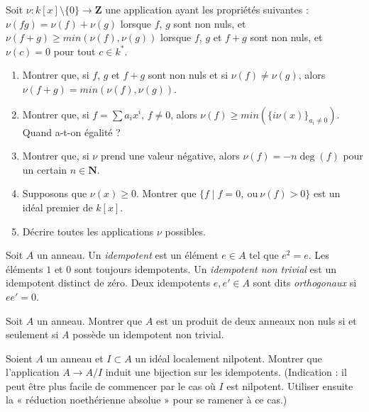 \begin{exercise}
\label{exercise-valuation}
Soit $\nu : k[x]\setminus \{0\}  \to {\mathbf Z}$ une application
ayant les propriétés suivantes : $\nu(fg) = \nu(f) + \nu(g)$ lorsque
$f$, $g$ sont non nuls, et $\nu(f + g) \geq min(\nu(f), \nu(g))$ lorsque
$f$, $g$ et $f + g$ sont non nuls, et $\nu(c) = 0$ pour tout $c\in k^*$.
\begin{enumerate}
\item Montrer que, si $f$, $g$ et $f + g$ sont non nuls et si
$\nu(f) \not = \nu(g)$, alors $\nu(f + g) = min(\nu(f), \nu(g))$.
\item Montrer que, si $f = \sum a_i x^i$, $f\not = 0$, alors
$\nu(f) \geq min(\{i\nu(x)\}_{a_i\not = 0})$. Quand a-t-on égalité ?
\item Montrer que, si $\nu$ prend une valeur négative, alors
$\nu(f) = -n \deg(f)$ pour un certain $n\in {\mathbf N}$.
\item Supposons que $\nu(x) \geq 0$. Montrer que
$\{f \mid f = 0, \ \text{ou}\ \nu(f) > 0\}$ est un idéal premier de $k[x]$.
\item Décrire toutes les applications $\nu$ possibles.
\end{enumerate}
\end{exercise}


\noindent
Soit $A$ un anneau. Un {\it idempotent} est un élément $e \in A$
tel que $e^2 = e$. Les éléments $1$ et $0$ sont toujours idempotents.
Un {\it idempotent non trivial} est un idempotent distinct de zéro.
Deux idempotents $e, e' \in A$ sont dits {\it orthogonaux}
si $ee' = 0$.

\begin{exercise}
\label{exercise-product}
Soit $A$ un anneau. Montrer que $A$ est un produit de deux anneaux non nuls si
et seulement si $A$ possède un idempotent non trivial.
\end{exercise}

\begin{exercise}
\label{exercise-lift-idempotents}
Soient $A$ un anneau et $I \subset A$ un idéal localement nilpotent.
Montrer que l'application $A \to A/I$ induit une bijection sur les idempotents.
(Indication : il peut être plus facile de commencer par le cas où $I$ est nilpotent.
Utiliser ensuite la « réduction noethérienne absolue » pour se ramener à ce cas.)
\end{exercise}







